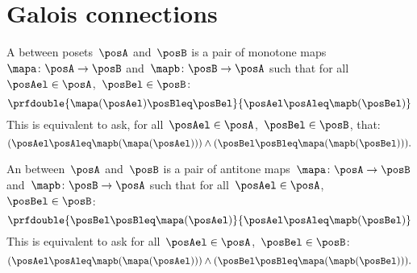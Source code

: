 

\section{Galois connections}\label{subsec:galois-connections}

\begin{ctdefinition}
    A \emph{} between posets~$\posA$ and~$\posB$ is a pair of monotone maps~$\mapa\colon \posA\to \posB$ and~$\mapb\colon \posB\to \posA$ such that for all~$\posAel\in \posA$,~$\posBel\in \posB$:
    \begin{equation}
        \prfdouble{\mapa(\posAel) \posBleq \posBel}{\posAel \posAleq \mapb(\posBel)}
    \end{equation}
    This is equivalent to ask, for all~$\posAel\in \posA$,~$\posBel\in \posB$, that:
    \begin{equation}
        (\posAel\posAleq \mapb(\mapa(\posAel)))
        \wedge (\posBel\posBleq \mapa(\mapb(\posBel))).
    \end{equation}
\end{ctdefinition}

\begin{ctdefinition}
    An \emph{} between~$\posA$ and~$\posB$ is a pair of antitone maps~$\mapa\colon \posA\to \posB$ and~$\mapb \colon \posB\to \posA$ such that for all~$\posAel\in \posA$,~$\posBel\in \posB$:
    \begin{equation}
        \prfdouble{\posBel \posBleq \mapa(\posAel)}{\posAel \posAleq \mapb(\posBel)}
    \end{equation}
    This is equivalent to ask for all~$\posAel\in \posA$,~$\posBel\in \posB$:
    \begin{equation}
        (\posAel \posAleq \mapb(\mapa(\posAel)))
        \wedge  (\posBel \posBleq \mapa(\mapb(\posBel))).
    \end{equation}
\end{ctdefinition}

